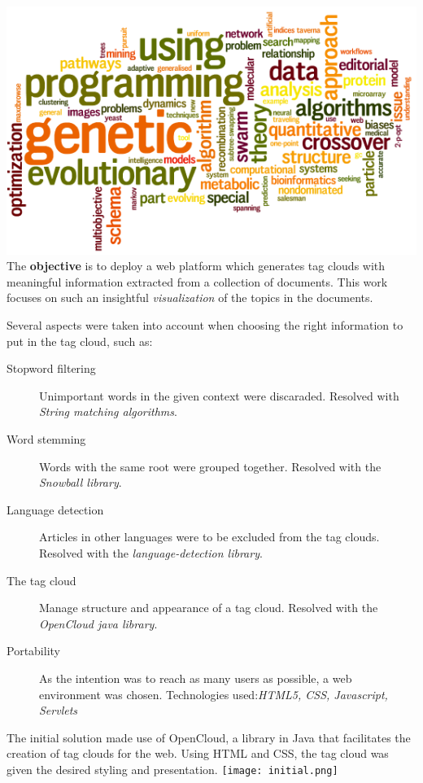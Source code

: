 \documentclass[a0paper, portrait]{baposter}
\begin{document}
\begin{poster}
{    %
    \includegraphics[height=0.1\textheight]{wordle2.png}
    \newline
    The {\bf objective} is to deploy a web platform which generates tag clouds with meaningful information extracted from a collection of documents. This work focuses on such an insightful {\em visualization} of the topics in the documents. %
  }

   {
    Several aspects were taken into account when choosing the right information to put in the tag cloud, such as: \newline
    \begin{description}
    \item[Stopword filtering] Unimportant words in the given context were discaraded. Resolved with {\em String matching algorithms}.
    \item[Word stemming] Words with the same root were grouped together. Resolved with the {\em Snowball library}.
    \item[Language detection] Articles in other languages were to be excluded from the tag clouds. Resolved with the {\em language-detection library}.
    \item[The tag cloud] Manage structure and appearance of a tag cloud. Resolved with the {\em OpenCloud java library}.
    \item[Portability] As the intention was to reach as many users as possible, a web environment was chosen. Technologies used:{\em HTML5, CSS, Javascript, Servlets}
    \end{description}
  }
   {
    The initial solution made use of OpenCloud, a library in Java that facilitates the creation of tag clouds for the web. Using HTML and CSS, the tag cloud was given the desired styling and presentation.
    \newline
    \texttt{[image: initial.png]}
  }


\end{poster}
\end{document}
